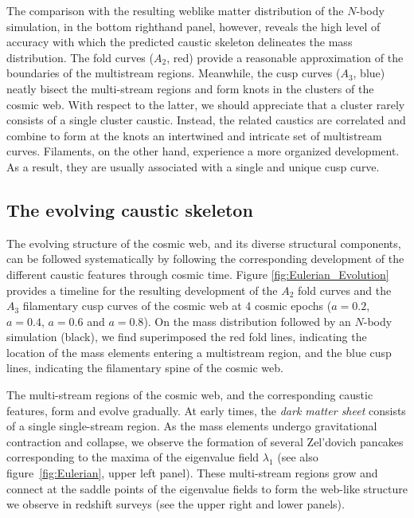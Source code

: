 \documentclass[a4paper, 11pt]{article}
\begin{document}
The comparison with the resulting weblike matter distribution of the $N$-body simulation, in the bottom righthand panel, however, reveals the high level of accuracy with which the predicted caustic skeleton delineates the mass distribution. The fold curves ($A_2$, red) provide a reasonable approximation of the boundaries of the multistream regions. Meanwhile, the cusp curves ($A_3$, blue) neatly bisect the multi-stream regions and form knots in the clusters of the cosmic web. With respect to the latter, we should appreciate that a cluster rarely consists of a single cluster caustic. Instead, the related caustics are correlated and combine to form at the knots an intertwined and intricate set of multistream curves. Filaments, on the other hand, experience a more organized development. As a result, they are usually associated with a single and unique cusp curve. 

\subsection{The evolving caustic skeleton}
The evolving structure of the cosmic web, and its diverse structural components, can be followed systematically by following the corresponding development of the different caustic features through cosmic time. Figure \ref{fig:Eulerian_Evolution} provides a timeline for the resulting development of the $A_2$ fold curves and the $A_3$ filamentary cusp curves of the cosmic web at 4 cosmic epochs ($a=0.2$, $a=0.4$, $a=0.6$ and $a=0.8$). On the mass distribution followed by an $N$-body simulation (black), we find superimposed the red fold lines, indicating the location of the mass elements entering a multistream region, and the blue cusp lines, indicating the filamentary spine of the cosmic web. 

The multi-stream regions of the cosmic web, and the corresponding caustic features, form and evolve gradually. At early times, the {\it dark matter sheet} consists of a single single-stream region. As the mass elements undergo gravitational contraction and collapse, we observe the formation of several Zel'dovich pancakes corresponding to the maxima of the eigenvalue field $\lambda_1$ (see also figure~\ref{fig:Eulerian}, upper left panel). These multi-stream regions grow and connect at the saddle points of the eigenvalue fields to form the web-like structure we observe in redshift surveys (see the upper right and lower panels).
\end{document}
